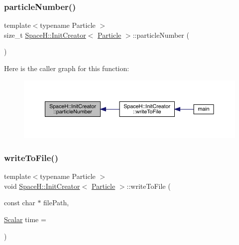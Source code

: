 \mbox{\label{class_space_h_1_1_init_creator_ad6dde97c265c5336f5d9e16b36dfad5c}} 
\subsubsection{\texorpdfstring{particle\+Number()}{particleNumber()}}
{\footnotesize\ttfamily template$<$typename Particle $>$ \\
size\+\_\+t \mbox{\hyperlink{class_space_h_1_1_init_creator}{Space\+H\+::\+Init\+Creator}}$<$ \mbox{\hyperlink{struct_space_h_1_1_particle}{Particle}} $>$\+::particle\+Number (\begin{DoxyParamCaption}{ }\end{DoxyParamCaption})\hspace{0.3cm}{\ttfamily [inline]}}

Here is the caller graph for this function\+:
\nopagebreak
\begin{figure}[H]
\begin{center}
\leavevmode
\includegraphics[width=350pt]{class_space_h_1_1_init_creator_ad6dde97c265c5336f5d9e16b36dfad5c_icgraph}
\end{center}
\end{figure}
\mbox{\label{class_space_h_1_1_init_creator_a6cf46010b11b3b7ad19f1d37e2cb1cb4}} 
\subsubsection{\texorpdfstring{write\+To\+File()}{writeToFile()}}
{\footnotesize\ttfamily template$<$typename Particle $>$ \\
void \mbox{\hyperlink{class_space_h_1_1_init_creator}{Space\+H\+::\+Init\+Creator}}$<$ \mbox{\hyperlink{struct_space_h_1_1_particle}{Particle}} $>$\+::write\+To\+File (\begin{DoxyParamCaption}\item[{const char $\ast$}]{file\+Path,  }\item[{\mbox{\hyperlink{class_space_h_1_1_init_creator_ac049ccad04f7cd33cc95b17ad763a988}{Scalar}}}]{time = {} }\end{DoxyParamCaption})\hspace{0.3cm}{\ttfamily [inline]}}

